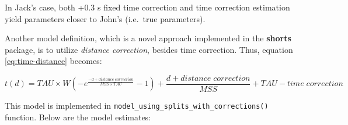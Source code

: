 \documentclass[fleqn,10pt,lineno]{wlpeerj} %
\begin{document}
\begin{table}[!h]
\centering
{}
\end{table}

In Jack's case, both +0.3 s fixed time correction and time correction estimation yield parameters closer to John's (i.e.~true parameters).

Another model definition, which is a novel approach implemented in the \textbf{shorts} package, is to utilize \emph{distance correction}, besides time correction. Thus, equation \eqref{eq:time-distance} becomes:

\begin{equation}
  t(d) = TAU \times W(-e^{\frac{-d + distance \; correction}{MSS \times TAU}} - 1) + \frac{d + distance \; correction}{MSS} + TAU - time \; correction \label{eq:distance-correction}
\end{equation}

This model is implemented in \texttt{model\_using\_splits\_with\_corrections()} function. Below are the model estimates:
\end{document}

